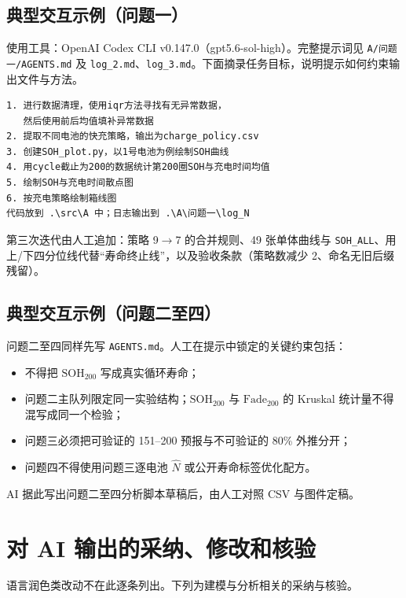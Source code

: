 \documentclass[a4paper,12pt,UTF8,zihao=-4]{ctexart}
\begin{document}
\subsection{典型交互示例（问题一）}

使用工具：OpenAI Codex CLI v0.147.0（gpt5.6-sol-high）。完整提示词见 \texttt{A/问题一/AGENTS.md} 及 \texttt{log\_2.md}、\texttt{log\_3.md}。下面摘录任务目标，说明提示如何约束输出文件与方法。

\begin{lstlisting}[caption={问题一 AGENTS.md 任务目标摘录}]
1. 进行数据清理，使用iqr方法寻找有无异常数据，
   然后使用前后均值填补异常数据
2. 提取不同电池的快充策略，输出为charge_policy.csv
3. 创建SOH_plot.py，以1号电池为例绘制SOH曲线
4. 用cycle截止为200的数据统计第200圈SOH与充电时间均值
5. 绘制SOH与充电时间散点图
6. 按充电策略绘制箱线图
代码放到 .\src\A 中；日志输出到 .\A\问题一\log_N
\end{lstlisting}

第三次迭代由人工追加：策略 9\(\rightarrow\)7 的合并规则、49 张单体曲线与 \texttt{SOH\_ALL}、用上/下四分位线代替“寿命终止线”，以及验收条款（策略数减少 2、命名无旧后缀残留）。

\subsection{典型交互示例（问题二至四）}

问题二至四同样先写 \texttt{AGENTS.md}。人工在提示中锁定的关键约束包括：

\begin{itemize}
  \item 不得把 \(\mathrm{SOH}_{200}\) 写成真实循环寿命；
  \item 问题二主队列限定同一实验结构；\(\mathrm{SOH}_{200}\) 与 \(\mathrm{Fade}_{200}\) 的 Kruskal 统计量不得混写成同一个检验；
  \item 问题三必须把可验证的 151--200 预报与不可验证的 80\% 外推分开；
  \item 问题四不得使用问题三逐电池 \(\hat N\) 或公开寿命标签优化配方。
\end{itemize}

AI 据此写出问题二至四分析脚本草稿后，由人工对照 CSV 与图件定稿。

\section{对 AI 输出的采纳、修改和核验}

语言润色类改动不在此逐条列出。下列为建模与分析相关的采纳与核验。
\end{document}
